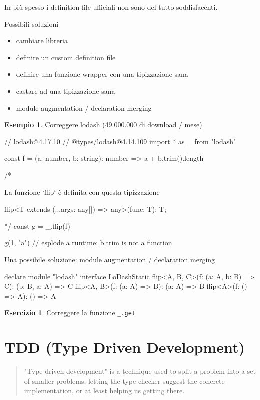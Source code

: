 \documentclass[12pt]{article}
\theoremstyle{definition}
\newtheorem{example}{Esempio}[subsection]
\newtheorem{exercise}{Esercizio}[subsection]
\newenvironment{code}
  {\vspace{0.5cm} \VerbatimEnvironment\begin{typescriptcode}}
  {\end{typescriptcode} \vspace{0.2cm}}
\begin{document}
In più spesso i definition file ufficiali non sono del tutto soddisfacenti.

Possibili soluzioni

\begin{itemize}
\item cambiare libreria
\item definire un custom definition file
\item definire una funzione wrapper con una tipizzazione sana
\item castare ad una tipizzazione sana
\item module augmentation / declaration merging
\end{itemize}

\begin{example}
Correggere lodash (49.000.000 di download / mese)

\begin{code}
// lodash@4.17.10
// @types/lodash@4.14.109
import * as _ from "lodash"

const f = (a: number, b: string): number =>
  a + b.trim().length

/*

  La funzione `flip` è definita con questa tipizzazione

  flip<T extends (...args: any[]) => any>(func: T): T;

*/
const g = _.flip(f)

g(1, "a") // esplode a runtime: b.trim is not a function
\end{code}

Una possibile soluzione: module augmentation / declaration merging

\begin{code}
declare module "lodash" {
  interface LoDashStatic {
    flip<A, B, C>(f: (a: A, b: B) => C): (b: B, a: A) => C
    flip<A, B>(f: (a: A) => B): (a: A) => B
    flip<A>(f: () => A): () => A
  }
}
\end{code}

\end{example}

\begin{exercise}
Correggere la funzione \texttt{\_.get}
\end{exercise}

\newpage
\section{TDD (Type Driven Development)}

\begin{quote}
"Type driven development" is a technique used to split a problem into a set of smaller problems,
letting the type checker suggest the concrete implementation, or at least helping us getting there.
\end{quote}
\end{document}
